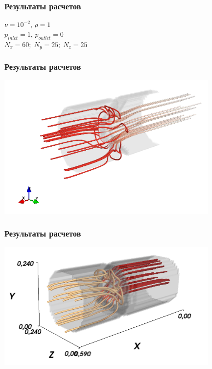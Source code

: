 \documentclass[14pt]{beamer}
\begin{document}
\begin{frame}
\frametitle{Результаты расчетов}
\begin{center}
    $\nu = 10^{-2}$, $\rho = 1$\\
    $p_{inlet} = 1$, $p_{outlet} = 0$\\
    $N_{x}=60;\;N_{y}=25;\;N_{z}=25$
\end{center}
\end{frame}

\begin{frame}
\frametitle{Результаты расчетов}
    \begin{center}
	\includegraphics[width=11cm]{valves_resized.png}
    \end{center}
\end{frame}

\begin{frame}
\frametitle{Результаты расчетов}
    \begin{center}
	\includegraphics[width=11cm]{valves_more_opened4.png}
    \end{center}
\end{frame}
\end{document}
